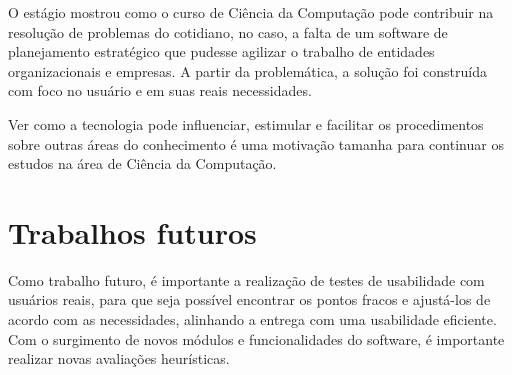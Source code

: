 O estágio mostrou como o curso de Ciência da Computação pode contribuir na resolução de problemas do cotidiano, no caso, a falta de um software de planejamento estratégico que pudesse agilizar o trabalho de entidades organizacionais e empresas. A partir da problemática, a solução foi construída com foco no usuário e em suas reais necessidades.

Ver como a tecnologia pode influenciar, estimular e facilitar os procedimentos sobre outras áreas do conhecimento é uma motivação tamanha para continuar os estudos na área de Ciência da Computação. 

\section{Trabalhos futuros}

Como trabalho futuro, é importante a realização de testes de usabilidade com usuários reais, para que seja possível encontrar os pontos fracos e ajustá-los de acordo com as necessidades, alinhando a entrega com uma usabilidade eficiente. Com o surgimento de novos módulos e funcionalidades do software, é importante realizar novas avaliações heurísticas.